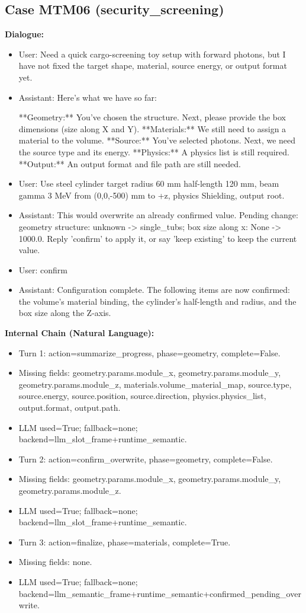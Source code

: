 \documentclass[11pt]{ctexart}
\begin{document}
\subsection{Case MTM06 (security\_screening)}
\textbf{Dialogue:}
\begin{itemize}
\item User: Need a quick cargo-screening toy setup with forward photons, but I have not fixed the target shape, material, source energy, or output format yet.
\item Assistant: Here's what we have so far:

**Geometry:** You've chosen the structure. Next, please provide the box dimensions (size along X and Y).
**Materials:** We still need to assign a material to the volume.
**Source:** You've selected photons. Next, we need the source type and its energy.
**Physics:** A physics list is still required.
**Output:** An output format and file path are still needed.
\item User: Use steel cylinder target radius 60 mm half-length 120 mm, beam gamma 3 MeV from (0,0,-500) mm to +z, physics Shielding, output root.
\item Assistant: This would overwrite an already confirmed value. Pending change: geometry structure: unknown -> single\_tubs; box size along x: None -> 1000.0. Reply 'confirm' to apply it, or say 'keep existing' to keep the current value.
\item User: confirm
\item Assistant: Configuration complete. The following items are now confirmed: the volume's material binding, the cylinder's half-length and radius, and the box size along the Z-axis.
\end{itemize}
\textbf{Internal Chain (Natural Language):}
\begin{itemize}
\item Turn 1: action=summarize\_progress, phase=geometry, complete=False.
\item Missing fields: geometry.params.module\_x, geometry.params.module\_y, geometry.params.module\_z, materials.volume\_material\_map, source.type, source.energy, source.position, source.direction, physics.physics\_list, output.format, output.path.
\item LLM used=True; fallback=none; backend=llm\_slot\_frame+runtime\_semantic.
\item Turn 2: action=confirm\_overwrite, phase=geometry, complete=False.
\item Missing fields: geometry.params.module\_x, geometry.params.module\_y, geometry.params.module\_z.
\item LLM used=True; fallback=none; backend=llm\_slot\_frame+runtime\_semantic.
\item Turn 3: action=finalize, phase=materials, complete=True.
\item Missing fields: none.
\item LLM used=True; fallback=none; backend=llm\_semantic\_frame+runtime\_semantic+confirmed\_pending\_overwrite.
\end{itemize}
\end{document}
